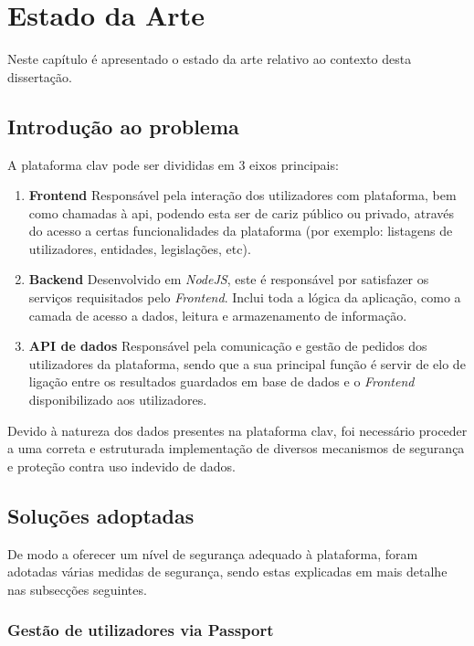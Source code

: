 \chapter{Estado da Arte}

Neste capítulo é apresentado o estado da arte relativo ao contexto desta dissertação. 

\section{Introdução ao problema}

A plataforma \gls{clav} pode ser divididas em 3 eixos principais:

\begin{enumerate}
    \item \textbf{Frontend}
    Responsável pela interação dos utilizadores com plataforma, bem como chamadas à \gls{api}, podendo esta ser de cariz público ou privado, através do acesso a certas funcionalidades da plataforma (por exemplo: listagens de utilizadores, entidades, legislações, etc).
    
    \item \textbf{Backend}
    Desenvolvido em \emph{NodeJS}, este é responsável por satisfazer os serviços requisitados pelo \emph{Frontend}. Inclui toda a lógica da aplicação, como a camada de acesso a dados, leitura e armazenamento de informação.
    
    \item \textbf{API de dados}
    Responsável pela comunicação e gestão de pedidos dos utilizadores da plataforma, sendo que a sua principal função é servir de elo de ligação entre os resultados guardados em base de dados e o \emph{Frontend} disponibilizado aos utilizadores.
\end{enumerate}

Devido à natureza dos dados presentes na plataforma \gls{clav}, foi necessário proceder a uma correta e estruturada implementação de diversos mecanismos de segurança e proteção contra uso indevido de dados.

\cleardoublepage
\section{Soluções adoptadas}

De modo a oferecer um nível de segurança adequado à plataforma, foram adotadas várias medidas de segurança, sendo estas explicadas em mais detalhe nas subsecções seguintes.

\subsection{Gestão de utilizadores via Passport}

